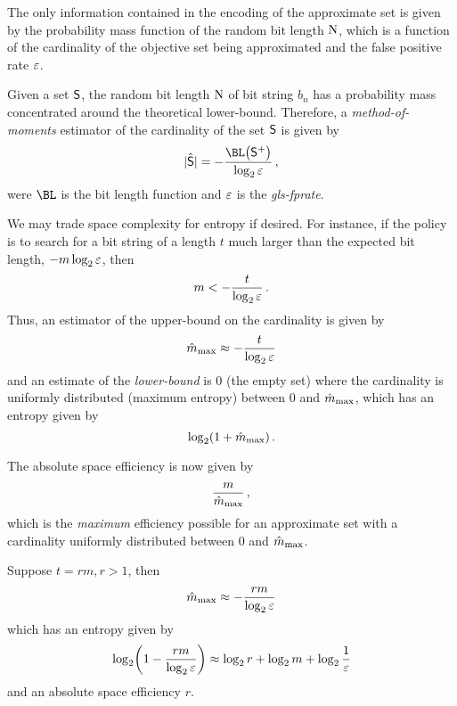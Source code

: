 \documentclass[ ../main.tex]{subfiles}
\begin{document}
The only information contained in the encoding of the approximate set is given 
by the probability mass function of the random bit length $\mathrm{N}$, which is a 
function of the cardinality of the objective set being approximated and the 
false positive rate $\varepsilon$.

Given a set $\Set{S}$, the random bit length $\mathrm{N}$ of bit string $b_n$ has a probability mass concentrated around the theoretical lower-bound. Therefore, a \emph{method-of-moments} estimator of the cardinality of the set $\Set{S}$ is given by
\begin{equation}
    \hat{\Card{\Set{S}}} = -\frac{\BL\!\left(\PASet{S}\right)}{\log_2 \fprate}\,,
\end{equation}
were $\BL$ is the bit length function and $\varepsilon$ is the \emph{\gls{gls-fprate}}.

We may trade space complexity for entropy if desired. For instance, if the policy is to search for a bit string of a length $t$ much larger than the expected bit length, $-m \log_2 \varepsilon$, then
\begin{equation}
    m < -\frac{t}{\log_2 \varepsilon}\,.
\end{equation}
Thus, an estimator of the upper-bound on the cardinality is given by
\begin{equation}
    \hat{m}_{\rm{max}} \approx -\frac{t}{\log_2 \varepsilon}
\end{equation}
and an estimate of the \emph{lower-bound} is $0$ (the empty set) where the cardinality is uniformly distributed (maximum entropy) between $0$ and $\hat{m}_{\rm{max}}$, which has an entropy given by
\begin{equation}
    \log_2(1+\hat{m}_{\rm{max}})\,.
\end{equation}

The absolute space efficiency is now given by
\begin{equation}
    \frac{m}{\hat{m}_{\rm{max}}}\,,
\end{equation}
which is the \emph{maximum} efficiency possible for an approximate set with a cardinality uniformly distributed between $0$ and $\hat{m}_{\mathrm{max}}$.

\begin{example}
Suppose $t = r m, r > 1$, then
\begin{equation}
    \hat{m}_{\rm{max}} \approx -\frac{r m}{\log_2 \varepsilon}
\end{equation}
which has an entropy given by
\begin{equation}
    \log_2\!\left(1 -\frac{r m}{\log_2 \varepsilon}\right) \approx \log_2 r + \log_2 m + \log_2 \frac{1}{\varepsilon}
\end{equation}
and an absolute space efficiency $r$.
\end{example}
\end{document}
